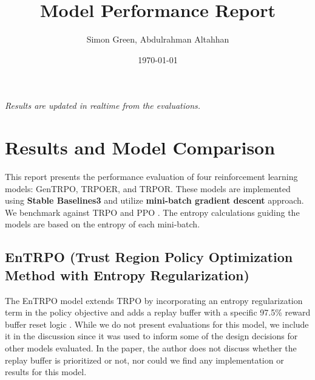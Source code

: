 \documentclass{svproc}
\begin{document}
\title{Model Performance Report}

\author{Simon Green, Abdulrahman Altahhan}


\date{\today}

\maketitle

\begin{center}
  {\it Results are updated in realtime from the evaluations.}
\end{center}


\section{Results and Model Comparison}

This report presents the performance evaluation of four reinforcement learning models: GenTRPO, TRPOER, and TRPOR. These models are implemented using \textbf{Stable Baselines3} and utilize \textbf{mini-batch gradient descent} approach. We benchmark against TRPO and PPO \cite{schulman2017trustregionpolicyoptimization, schulman2017proximalpolicyoptimizationalgorithms}. The entropy calculations guiding the models are based on the entropy of each mini-batch.


\subsection{EnTRPO (Trust Region Policy Optimization Method with Entropy Regularization)}

The EnTRPO model extends TRPO by incorporating an entropy regularization term in the policy objective and adds a replay buffer with a specific 97.5\% reward buffer reset logic \cite{roostaie2021entrpotrustregionpolicy}. While we do not present evaluations for this model, we include it in the discussion since it was used to inform some of the design decisions for other models evaluated. In the paper, the author does not discuss whether the replay buffer is prioritized or not, nor could we find any implementation or results for this model.
\end{document}
